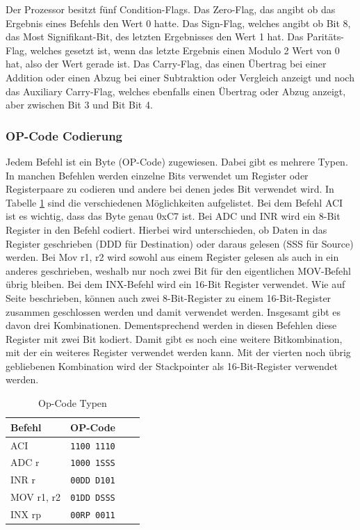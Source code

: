 \documentclass[12pt]{article}
\begin{document}
\noindent
Der Prozessor besitzt fünf Condition-Flags. Das Zero-Flag, das angibt ob das Ergebnis eines Befehls den Wert 0 hatte. Das Sign-Flag, welches angibt ob Bit 8, das Most Signifikant-Bit, des letzten Ergebnisses den Wert 1 hat. Das Paritäts-Flag, welches gesetzt ist, wenn das letzte Ergebnis einen Modulo 2 Wert von 0 hat, also der Wert gerade ist. Das Carry-Flag, das einen Übertrag bei einer Addition oder einen Abzug bei einer Subtraktion oder Vergleich anzeigt und noch das Auxiliary Carry-Flag, welches ebenfalls einen Übertrag oder Abzug anzeigt, aber zwischen Bit 3 und Bit Bit 4. \cite{IntMan45}
\\

\subsubsection{OP-Code Codierung}
\label{chapter:opcode}
Jedem Befehl ist ein Byte (OP-Code) zugewiesen. Dabei gibt es mehrere Typen. In manchen Befehlen werden einzelne Bits verwendet um Register oder Registerpaare zu codieren und andere bei denen jedes Bit verwendet wird. In Tabelle \ref{table:opcode} sind die verschiedenen Möglichkeiten aufgelistet. Bei dem Befehl ACI ist es wichtig, dass das Byte genau 0xC7 ist. Bei ADC und INR wird ein 8-Bit Register in den Befehl codiert. Hierbei wird unterschieden, ob Daten in das Register geschrieben (DDD für Destination) oder daraus gelesen (SSS für Source) werden. Bei Mov r1, r2 wird sowohl aus einem Register gelesen als auch in ein anderes geschrieben, weshalb nur noch zwei Bit für den eigentlichen MOV-Befehl übrig bleiben. Bei dem INX-Befehl wird ein 16-Bit Register verwendet. Wie auf Seite \pageref{RegisterSection} beschrieben, können auch zwei 8-Bit-Register zu einem 16-Bit-Register zusammen geschlossen werden und damit verwendet werden. Insgesamt gibt es davon drei Kombinationen. Dementsprechend werden in diesen Befehlen diese Register mit zwei Bit kodiert. Damit gibt es noch eine weitere Bitkombination, mit der ein weiteres Register verwendet werden kann. Mit der vierten noch übrig gebliebenen Kombination wird der Stackpointer als 16-Bit-Register verwendet werden. 

\begin{table}[h]
\centering
\begin{tabular}{|l|c|c|c| } 
 \hline
 Befehl & OP-Code \\
 \hline 
 ACI & \texttt{1100 1110} \\ 
 ADC r & \texttt{1000 1SSS} \\
 INR r & \texttt{00DD D101} \\
 MOV r1, r2 & \texttt{01DD DSSS} \\
 INX rp & \texttt{00RP 0011} \\
 \hline
\end{tabular}
\caption{Op-Code Typen \cite{IntMan30}}
\label{table:opcode}
\end{table}
\end{document}

